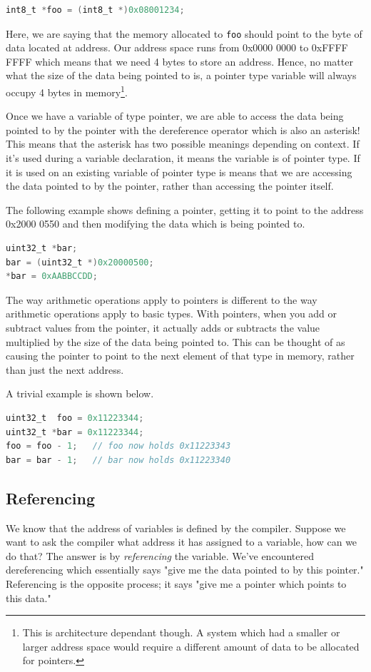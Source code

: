 \begin{lstlisting}[language=C]
int8_t *foo = (int8_t *)0x08001234;
\end{lstlisting}

Here, we are saying that the memory allocated to \texttt{foo} should point to the byte of data located at address.
Our address space runs from 0x0000 0000 to 0xFFFF FFFF which means that we need 4 bytes to store an address. Hence, no matter what the size of the data being pointed to is, a pointer type variable will always occupy 4 bytes in memory\footnote{This is architecture dependant though. A system which had a smaller or larger address space would require a different amount of data to be allocated for pointers.}.

Once we have a variable of type pointer, we are able to access the data being pointed to by the pointer with the dereference operator which is also an asterisk! This means that the asterisk has two possible meanings depending on context. If it's used during a variable declaration, it means the variable is of pointer type. If it is used on an existing variable of pointer type is means that we are accessing the data pointed to by the pointer, rather than accessing the pointer itself.

The following example shows defining a pointer, getting it to point to the address 0x2000 0550 and then modifying the data which is being pointed to.
\begin{lstlisting}[language=C]
uint32_t *bar;
bar = (uint32_t *)0x20000500;
*bar = 0xAABBCCDD;
\end{lstlisting}

The way arithmetic operations apply to pointers is different to the way arithmetic operations apply to basic types. With pointers, when you add or subtract values from the pointer, it actually adds or subtracts the value multiplied by the size of the data being pointed to. This can be thought of as causing the pointer to point to the next element of that type in memory, rather than just the next address.

A trivial example is shown below.
\begin{lstlisting}[language=C]
uint32_t  foo = 0x11223344;
uint32_t *bar = 0x11223344;
foo = foo - 1;   // foo now holds 0x11223343
bar = bar - 1;   // bar now holds 0x11223340
\end{lstlisting}

\subsection{Referencing}
We know that the address of variables is defined by the compiler. Suppose we want to ask the compiler what address it has assigned to a variable, how can we do that? The answer is by \emph{referencing} the variable. We've encountered dereferencing which essentially says "give me the data pointed to by this pointer." Referencing is the opposite process; it says "give me a pointer which points to this data." 

